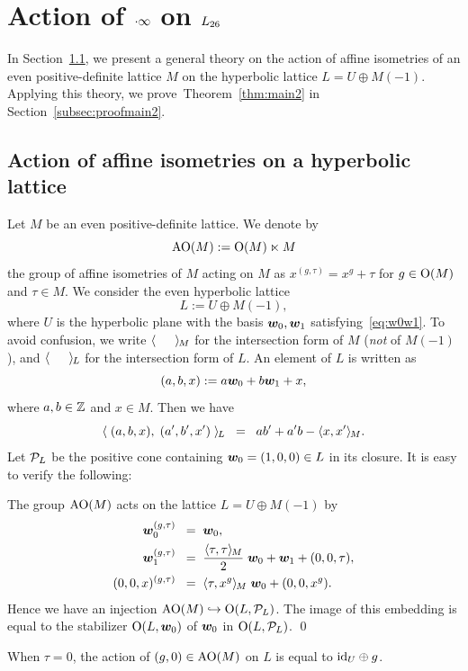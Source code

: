 \documentclass{amsart} %
\begin{document}
\section{Action of $\cdot \infty$ on $L_{26}$}\label{sec:proofThm2}
%
In Section~\ref{subsec:AOGM}, 
we present a general theory on the action of affine isometries of an even positive-definite lattice $M$
on the hyperbolic lattice $L=U\oplus M(-1)$.
Applying this theory,
we  prove~Theorem~\ref{thm:main2} in Section~\ref{subsec:proofmain2}.
%
%
\subsection{Action of affine isometries on a hyperbolic lattice}\label{subsec:AOGM}
%
Let $M$ be an even positive-definite lattice.
We denote by 
\[
\mathord{\mathrm{AO}}(M):=\mathord{\mathrm{O}}(M)\ltimes M
\]
 the group of affine isometries of $M$
acting on $M$ as $x^{(g, \tau)}=x^g+\tau$
for $g\in \mathord{\mathrm{O}}(M)$ and $\tau\in M$.
We consider the even hyperbolic lattice
\[
L:=U\oplus M(-1),
\]
where $U$ is the hyperbolic plane with the basis $\boldsymbol{w}_0, \boldsymbol{w}_1$
satisfying~\eqref{eq:w0w1}.
To avoid confusion, we write $\langle \phantom{a,a} \rangle_{\hskip -1pt M}$
for the intersection form of $M$ (\emph{not} of $M(-1)$),
and $\langle \phantom{a,a} \rangle_{\hskip -1pt L}$
for the intersection form of $L$.
An element of $L$ is written as 
\[
(a, b, x):=a\boldsymbol{w}_0+b \boldsymbol{w}_1+ x,
\]
where $a, b\in \mathord{\mathbb{Z}}$ and $x\in M$.
Then we have
\[
\langle \; (a, b, x), \; (a^{\prime}, b^{\prime}, x^{\prime})\; \rangle_{\hskip -1pt L}\;\;=\;\; ab^{\prime}+a^{\prime} b-\langle x, x^{\prime} \rangle_{\hskip -1pt M}.
\]
Let $\mathord{\mathcal{P}}_L$ be the positive cone containing 
$\boldsymbol{w}_0=(1,0, 0)\in L$ in its closure.
It is easy to verify the following:
%
\begin{proposition}\label{prop:embeddingAOG}
The group $\mathord{\mathrm{AO}}(M)$ acts on the lattice $L=U\oplus M(-1)$
by
%
\begin{align*}
\boldsymbol{w}_0^{(g, \tau)} \;\;=\;\; & \boldsymbol{w}_0, \\
\boldsymbol{w}_1^{(g, \tau)} \;\;=\;\; & \frac{\langle \tau, \tau \rangle_{\hskip -1pt M}}{2}\;\boldsymbol{w}_0+\boldsymbol{w}_1+(0,0,\tau), \\
(0,0,x)^{(g, \tau)} \;\;=\;\; &\langle \tau, x^g \rangle_{\hskip -1pt M} \;\boldsymbol{w}_0 + (0,0, x^g).
\end{align*}
Hence we have an injection $\mathord{\mathrm{AO}}(M)\hookrightarrow \mathord{\mathrm{O}}(L, \mathord{\mathcal{P}}_L)$.
The image of this embedding is equal to
the stabilizer $\mathord{\mathrm{O}}(L, \boldsymbol{w}_0)$ of $\boldsymbol{w}_0$ in $\mathord{\mathrm{O}}(L, \mathord{\mathcal{P}}_L)$.
\qed
%
\end{proposition}
%
\begin{remark}\label{rem:tau0}
When $\tau=0$, the action of $(g, 0)\in \mathord{\mathrm{AO}}(M)$ on $L$ 
is equal to $\mathord{\mathrm{id}}_U\oplus g$.
\end{remark}
\end{document}

